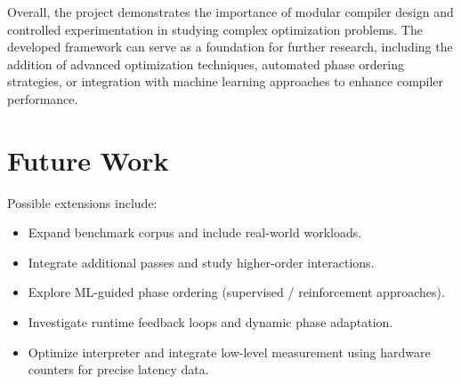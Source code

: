 \documentclass[conference]{IEEEtran}
\begin{document}
Overall, the project demonstrates the importance of modular compiler design and controlled experimentation in studying complex optimization problems. The developed framework can serve as a foundation for further research, including the addition of advanced optimization techniques, automated phase ordering strategies, or integration with machine learning approaches to enhance compiler performance.

\section{Future Work}
Possible extensions include:
\begin{itemize}
    \item Expand benchmark corpus and include real-world workloads.
    \item Integrate additional passes and study higher-order interactions.
    \item Explore ML-guided phase ordering (supervised / reinforcement approaches).
    \item Investigate runtime feedback loops and dynamic phase adaptation.
    \item Optimize interpreter and integrate low-level measurement using hardware counters for precise latency data.
\end{itemize}
\end{document}
